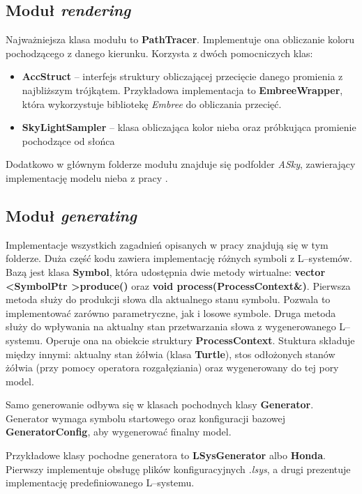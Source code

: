\documentclass[inz,shortabstract]{iithesis}
\begin{document}
        \subsection{Moduł \textit{rendering}}
            Najważniejsza klasa modułu to \textbf{PathTracer}. Implementuje ona obliczanie koloru pochodzącego z danego kierunku. Korzysta z dwóch pomocniczych klas:
            \begin{itemize}
                \item \textbf{AccStruct} -- interfejs struktury obliczającej przecięcie danego promienia z najbliższym trójkątem. Przykładowa implementacja to \textbf{EmbreeWrapper}, która wykorzystuje bibliotekę \textit{Embree} do obliczania przecięć. 
                \item \textbf{SkyLightSampler} -- klasa obliczająca kolor nieba oraz próbkująca promienie pochodzące od słońca
            \end{itemize}
            
            Dodatkowo w głównym folderze modułu znajduje się podfolder \textit{ASky}, zawierający implementację modelu nieba z pracy \cite{sky}.
            
        \subsection{Moduł \textit{generating}}
            Implementacje wszystkich zagadnień opisanych w pracy znajdują się w tym folderze. Duża część kodu zawiera implementację różnych symboli z L--systemów. Bazą jest klasa \textbf{Symbol}, która udostępnia dwie metody wirtualne: \textbf{vector \textless SymbolPtr \textgreater produce()} oraz \textbf{void process(ProcessContext\&)}. Pierwsza metoda służy do produkcji słowa dla aktualnego stanu symbolu. Pozwala to implementować zarówno parametryczne, jak i losowe symbole. Druga metoda służy do wpływania na aktualny stan przetwarzania słowa z wygenerowanego L--systemu. Operuje ona na obiekcie struktury \textbf{ProcessContext}. Stuktura składuje między innymi: aktualny stan żółwia (klasa \textbf{Turtle}), stos odłożonych stanów żółwia (przy pomocy operatora rozgałęziania) oraz wygenerowany do tej pory model.
            
            Samo generowanie odbywa się w klasach pochodnych klasy \textbf{Generator}. Generator wymaga symbolu startowego oraz konfiguracji bazowej \textbf{GeneratorConfig}, aby wygenerować finalny model.
            
            Przykładowe klasy pochodne generatora to \textbf{LSysGenerator} albo \textbf{Honda}. Pierwszy implementuje obsługę plików konfiguracyjnych \textit{.lsys}, a drugi prezentuje implementację predefiniowanego L--systemu.
            
\end{document}
